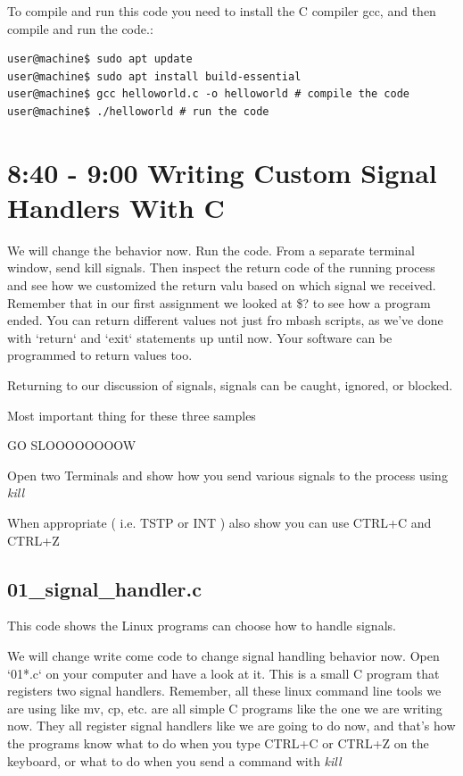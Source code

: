 \documentclass[8pt]{article}
\begin{document}


To compile and run this code you need to install the C compiler gcc, and then
compile and run the code.:

\begin{lstlisting}
user@machine$ sudo apt update
user@machine$ sudo apt install build-essential
user@machine$ gcc helloworld.c -o helloworld # compile the code
user@machine$ ./helloworld # run the code
\end{lstlisting}

\section{8:40 - 9:00 Writing Custom Signal Handlers With C}

We will change the behavior now. Run the code. From a separate terminal window, send kill signals. Then inspect the return code of the running process and see how we customized the return valu based on which signal we received. Remember that in our first assignment we looked at \$? to see how a program ended. You can return different values not just fro mbash scripts, as we've done with `return` and `exit` statements up until now. Your software can be programmed to return values too.

Returning to our discussion of signals, signals can be caught,  ignored, or blocked.

Most important thing for these three samples

{\LARGE GO SLOOOOOOOOW}

{\LARGE Open two Terminals and show how you send various signals to the process using \textit{kill}}

{\LARGE When appropriate ( i.e. TSTP or INT ) also show you can use CTRL+C and CTRL+Z}

\subsection{01\_signal\_handler.c}
This code shows the Linux programs can choose how to handle signals.

We will change write come code to change signal handling behavior now. Open `01*.c` on your computer and have a look at it. This is a small C program that registers two signal handlers. Remember, all these linux command line tools we are using like mv, cp, etc. are all simple C programs like the one we are writing now. They all register signal handlers like we are going to do now, and that's how the programs know what to do when you type CTRL+C or CTRL+Z on the keyboard, or what to do when you send a command with \textit{kill}
\end{document}
